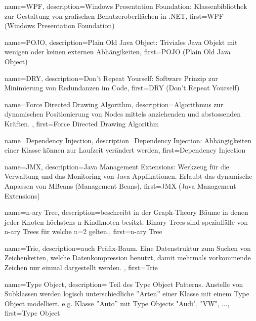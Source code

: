 {
	name={WPF},
	description={Windows Presentation Foundation: Klassenbibliothek zur Gestaltung von grafischen Benutzeroberflächen in .NET},
	first={WPF (Windows Presentation Foundation)}
}

{
	name={POJO},
	description={Plain Old Java Object: Triviales Java Objekt mit wenigen oder keinen externen Abhängikeiten},
	first={POJO (Plain Old Java Object)}
}

{
	name={DRY},
	description={Don't Repeat Yourself: Software Prinzip zur Minimierung von Redundanzen im Code},
	first={DRY (Don't Repeat Yourself)}
}

{
	name={Force Directed Drawing Algorithm},
	description={Algorithmus zur dynamischen Positionierung von Nodes mittels anziehenden und abstossenden Kräften. },
	first={Force Directed Drawing Algorithm}
}

{
	name={Dependency Injection},
	description={Dependency Injection: Abhängigkeiten einer Klasse können zur Laufzeit verändert werden},
	first={Dependency Injection}
}

{
	name={JMX},
	description={Java Management Extensions: Werkzeug für die Verwaltung und das Monitoring von Java Applikationen. Erlaubt das dynamische Anpassen von MBeans (Management Beans)},
	first={JMX (Java Management Extensions)}
}

{
	name={n-ary Tree},
	description={beschreibt in der Graph-Theory Bäume in denen jeder Knoten höchstens n Kindknoten besitzt. Binary Trees sind spezialfälle von n-ary Trees für welche n=2 gelten.},
	first={n-ary Tree}
}

{
	name={Trie},
	description={auch Präfix-Baum. Eine Datenstruktur zum Suchen von Zeichenketten, welche Datenkompression benutzt, damit mehrmals vorkommende Zeichen nur einmal dargestellt werden. },
	first={Trie}
}


{
	name={Type Object},
	description={ Teil des Type Object Patterns. Anstelle von Subklassen werden logisch unterschiedliche ''Arten'' einer Klasse mit einem Type Object modelliert. e.g. Klasse ''Auto'' mit Type Objects "Audi", "VW", ...},
	first={Type Object}
}



